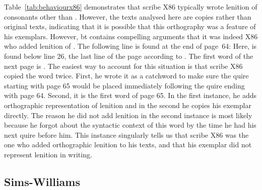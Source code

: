 Table~\ref{tab:behaviourx86} demonstrates that scribe X86 typically wrote lenition of consonants other than . However, the texts analysed here are copies rather than original texts, indicating that it is possible that this orthography was a feature of his exemplars. However, \acrshort{bt} contains compelling arguments that it was indeed X86 who added lenition of . The following line is found at the end of page~64:
Here,  is found below line 26, the last line of the page according to \textcite{evans_facsimile_1915}. The first word of the next page is .
The easiest way to account for this situation is that scribe X86  copied the word  twice. First, he wrote it as a catchword to make sure the quire starting with page 65 would be placed immediately following the quire ending with page 64. Second, it  is the first word of page 65. In the first instance, he adds orthographic representation of lenition and in the second he copies his exemplar directly. The reason he did not add lenition in the second instance is most likely because he forgot about the syntactic context of this word by the time he had his next quire before him. This instance singularly tells us that scribe X86 was the one who added orthographic lenition to his texts, and that his exemplar did not represent lenition in writing.


\subsection{Sims-Williams}
\label{sec:sims-williams}

